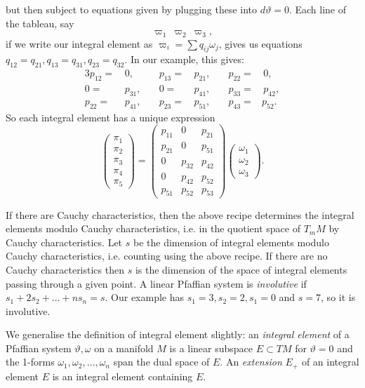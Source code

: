 but then subject to equations given by plugging these into \(d\vartheta=0\).
Each line of the tableau, say
\[
\varpi_1 \ \varpi_2 \ \varpi_3,
\]
if we write our integral element as \(\varpi_i = \sum q_{ij} \omega_j\),
gives us equations \(q_{12}=q_{21}, q_{13}=q_{31}, q_{23}=q_{32}\).
In our example, this gives:
\begin{alignat*}{3}
p_{12} =& \, 0,      & \quad p_{13} =& \, p_{21}, & \quad p_{22} =& \, 0, \\
0      =& \, p_{31}, & \quad 0=& \, p_{41},       & \quad p_{33} =& \, p_{42}, \\
p_{22} =& \, p_{41}, & \quad p_{23} =& \, p_{51}, & \quad p_{43} =& p_{52}.
\end{alignat*}
So each integral element has a unique expression
\[
\begin{pmatrix}
\pi_1 \\
\pi_2 \\
\pi_3 \\
\pi_4 \\
\pi_5
\end{pmatrix}
=
\begin{pmatrix}
p_{11} & 0      & p_{21} \\
p_{21} & 0      & p_{51} \\
0      & p_{32} & p_{42} \\
0      & p_{42} & p_{52} \\
p_{51} & p_{52} & p_{53}
\end{pmatrix}
\begin{pmatrix}
\omega_1 \\
\omega_2 \\
\omega_3
\end{pmatrix}.
\]

If there are Cauchy characteristics, then the above recipe determines the integral elements modulo Cauchy characteristics, i.e. in the quotient space of \(T_m M\) by Cauchy characteristics.
Let \(s\) be the dimension of integral elements modulo Cauchy characteristics, i.e. counting using the above recipe.
If there are no Cauchy characteristics then \(s\) is the dimension of the space of integral elements passing through a given point.
A linear Pfaffian system is \emph{involutive} if \(s_1+2s_2+\dots+ns_n=s\).
Our example has \(s_1=3, s_2=2, s_1=0\) and \(s=7\), so it is involutive.

We generalise the definition of integral element slightly: an \emph{integral element} of a Pfaffian system \(\vartheta,\omega\) on a manifold \(M\) is a linear subspace \(E \subset TM\) for \(\vartheta=0\) and the 1-forms \(\omega_1, \omega_2, \dots, \omega_n\) span the dual space of \(E\).
An \emph{extension} \(E_+\) of an integral element \(E\) is an integral element containing \(E\).

